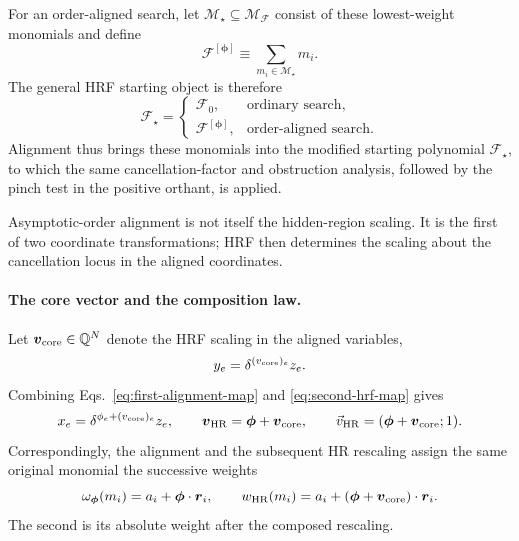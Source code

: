 \documentclass[a4paper,11pt]{article}
\newcommand{\HR}{\mathrm{HR}}
\newcommand{\vHR}{\vec v_{\rm HR}}
\begin{document}
For an order-aligned search, let
\(\mathcal M_\star\subseteq\mathcal M_{\mathcal F}\) consist of these
lowest-weight monomials and define
\begin{equation}
 \mathcal F^{[\boldsymbol\phi]}
 \equiv
 \sum_{m_i\in\mathcal M_\star}m_i.
\label{eq:alignmentface}
\end{equation}
The general HRF starting object is therefore
\begin{equation}
 \mathcal F_\star=
 \begin{cases}
   \mathcal F_0, & \text{ordinary search},\\
   \mathcal F^{[\boldsymbol\phi]}, & \text{order-aligned search}.
 \end{cases}
\label{eq:Fstar}
\end{equation}
Alignment thus brings these monomials into the modified starting polynomial
\(\mathcal F_\star\), to which the same cancellation-factor and obstruction
analysis, followed by the pinch test in the positive orthant, is applied.

Asymptotic-order alignment is not itself the hidden-region scaling.  It is
the first of two coordinate transformations; HRF then determines the scaling
about the cancellation locus in the aligned coordinates.

\paragraph{The core vector and the composition law.}

Let \(\boldsymbol v_{\rm core}\in\mathbb Q^N\) denote the HRF scaling in the aligned
variables,
\begin{equation}
 y_e=\delta^{(v_{\rm core})_e}z_e.
 \label{eq:second-hrf-map}
\end{equation}
Combining Eqs.~\eqref{eq:first-alignment-map} and
\eqref{eq:second-hrf-map} gives
\begin{equation}
 x_e=\delta^{\phi_e+(v_{\rm core})_e}z_e,
 \qquad
 \boldsymbol v_{\HR}=\boldsymbol\phi+\boldsymbol v_{\rm core},
 \qquad
 \vHR=(\boldsymbol\phi+\boldsymbol v_{\rm core};1).
 \label{eq:alignment-composition}
\end{equation}
Correspondingly, the alignment and the subsequent HR rescaling assign the
same original monomial the successive weights
\begin{equation}
 \omega_{\boldsymbol\phi}(m_i)
 =a_i+\boldsymbol\phi\cdot\boldsymbol r_i,
 \qquad
 w_{\HR}(m_i)
 =a_i+(\boldsymbol\phi+\boldsymbol v_{\rm core})\cdot\boldsymbol r_i.
 \label{eq:successive-monomial-weights}
\end{equation}
The second is its absolute weight after the composed rescaling.
\end{document}

